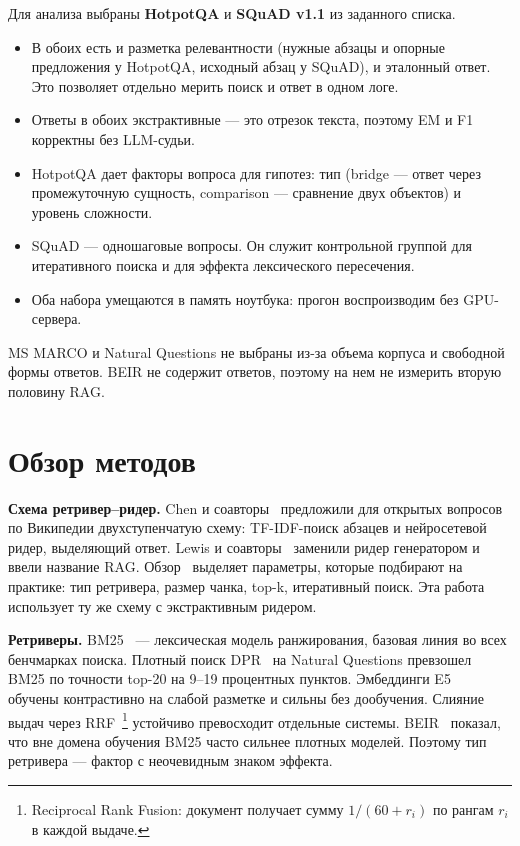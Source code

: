 Для анализа выбраны \textbf{HotpotQA} и \textbf{SQuAD v1.1} из заданного списка.
\begin{itemize}
\item В обоих есть и разметка релевантности (нужные абзацы и опорные предложения у HotpotQA, исходный абзац у SQuAD), и эталонный ответ. Это позволяет отдельно мерить поиск и ответ в одном логе.
\item Ответы в обоих экстрактивные --- это отрезок текста, поэтому EM и F1 корректны без LLM-судьи.
\item HotpotQA дает факторы вопроса для гипотез: тип (bridge --- ответ через промежуточную сущность, comparison --- сравнение двух объектов) и уровень сложности.
\item SQuAD --- одношаговые вопросы. Он служит контрольной группой для итеративного поиска и для эффекта лексического пересечения.
\item Оба набора умещаются в память ноутбука: прогон воспроизводим без GPU-сервера.
\end{itemize}

MS MARCO и Natural Questions не выбраны из-за объема корпуса и свободной формы ответов. BEIR не содержит ответов, поэтому на нем не измерить вторую половину RAG.

\section{Обзор методов}

\textbf{Схема ретривер--ридер.} Chen и соавторы~\cite{drqa} предложили для открытых вопросов по Википедии двухступенчатую схему: TF-IDF-поиск абзацев и нейросетевой ридер, выделяющий ответ. Lewis и соавторы~\cite{lewis2020} заменили ридер генератором и ввели название RAG. Обзор~\cite{gao2023} выделяет параметры, которые подбирают на практике: тип ретривера, размер чанка, top-k, итеративный поиск. Эта работа использует ту же схему с экстрактивным ридером.

\textbf{Ретриверы.} BM25~\cite{bm25} --- лексическая модель ранжирования, базовая линия во всех бенчмарках поиска. Плотный поиск DPR~\cite{dpr} на Natural Questions превзошел BM25 по точности top-20 на 9--19 процентных пунктов. Эмбеддинги E5~\cite{e5} обучены контрастивно на слабой разметке и сильны без дообучения. Слияние выдач через RRF~\cite{rrf}\footnote{Reciprocal Rank Fusion: документ получает сумму $1/(60+r_i)$ по рангам $r_i$ в каждой выдаче.} устойчиво превосходит отдельные системы. BEIR~\cite{beir} показал, что вне домена обучения BM25 часто сильнее плотных моделей. Поэтому тип ретривера --- фактор с неочевидным знаком эффекта.

